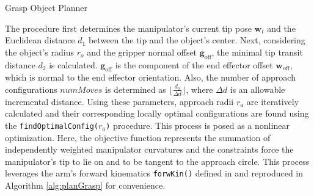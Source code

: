 \begin{algorithm}[!htbp]
\begin{small}
{  \KwRet{$\boldsymbol{\kappa}^*$} \; }
  \setcounter{AlgoLine}{0}
  \caption{Grasp Object Planner}
  \label{alg:planGrasp}
\end{small}

\end{algorithm}

The procedure first determines the manipulator's current tip pose $\mathbf{w}_t$ and the Euclidean distance $d_1$ between the tip and the object's center. 
Next, considering the object's radius $r_o$ and the gripper normal offset $\mathbf{g}_{\textrm{off}}$, the minimal tip transit distance $d_2$ is calculated. 
$\mathbf{g}_{\textrm{off}}$ is the component of the end effector offset $\mathbf{w}_{\textrm{off}}$, which is normal to the end effector orientation. 
Also, the number of approach configurations $numMoves$ is determined as $\lfloor \frac{d_2}{\Delta d} \rfloor$, where $\Delta d$ is an allowable incremental distance. 
Using these parameters, approach radii $r_a$ are iteratively calculated and their corresponding locally optimal configurations are found using the \texttt{findOptimalConfig($r_a$)} procedure. 
This process is posed as a nonlinear optimization. 
Here, the objective function represents the summation of independently weighted manipulator curvatures and the constraints force the manipulator's tip to lie on and to be tangent to the approach circle. 
This process leverages the arm's forward kinematics \texttt{forwKin()} defined in \cite{marchese2014design} and reproduced in Algorithm \ref{alg:planGrasp} for convenience.

